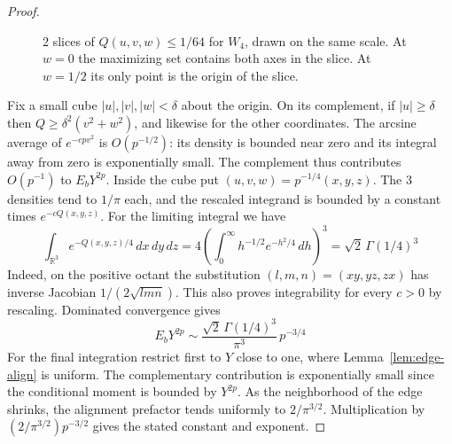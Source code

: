 \documentclass[11pt,a4paper]{article}
\theoremstyle{remark}
\begin{document}
\begin{proof}
\begin{figure}[H]
\centering
{}
\caption{2 slices of $Q(u,v,w)\le1/64$ for $W_4$, drawn on the same
scale. At $w=0$ the maximizing set contains both axes in the slice.
At $w=1/2$ its only point is the origin of the slice.}\label{fig:walsh-cross}
\end{figure}

Fix a small cube $|u|,|v|,|w|<\delta$ about the origin. On its complement,
if $|u|\ge\delta$ then $Q\ge\delta^2(v^2+w^2)$, and likewise for the
other coordinates. The arcsine average of $e^{-cp v^2}$ is $O(p^{-1/2})$:
its density is bounded near zero and its integral away from zero is
exponentially small. The complement thus contributes $O(p^{-1})$ to
$E_b Y^{2p}$. Inside the cube put $(u,v,w)=p^{-1/4}(x,y,z)$.
The 3 densities tend to $1/\pi$ each, and the rescaled integrand
is bounded by a constant times $e^{-cQ(x,y,z)}$. For the limiting integral
we have
\[
 \int_{\mathbb R^3}e^{-Q(x,y,z)/4}\,dx\,dy\,dz
 =4\left(\int_0^\infty h^{-1/2}e^{-h^2/4}\,dh\right)^3
 =\sqrt2\,\Gamma(1/4)^3
\]
Indeed, on the positive octant the substitution $(l,m,n)=(xy,yz,zx)$
has inverse Jacobian $1/(2\sqrt{lmn})$. This also proves integrability
for every $c>0$ by rescaling. Dominated convergence gives
\[
 E_b Y^{2p}\sim \frac{\sqrt2\,\Gamma(1/4)^3}{\pi^3}\,p^{-3/4}
\]
For the final integration restrict first to $Y$ close to one, where
Lemma~\ref{lem:edge-align} is uniform. The complementary contribution is
exponentially small since the conditional moment is bounded by $Y^{2p}$.
As the neighborhood of the edge shrinks, the alignment prefactor tends
uniformly to $2/\pi^{3/2}$. Multiplication by $(2/\pi^{3/2})p^{-3/2}$
gives the stated constant and exponent.
\end{proof}
\end{document}
